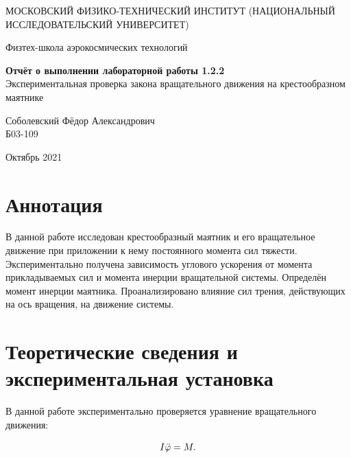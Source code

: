 \documentclass[a4paper,12pt]{article} %
\date{\today}
\begin{document}
\begin{titlepage}
	\begin{center}
		{\large МОСКОВСКИЙ ФИЗИКО-ТЕХНИЧЕСКИЙ ИНСТИТУТ (НАЦИОНАЛЬНЫЙ ИССЛЕДОВАТЕЛЬСКИЙ УНИВЕРСИТЕТ)}
	\end{center}
	\begin{center}
		{\large Физтех-школа аэрокосмических технологий}
	\end{center}
	
	
	\vspace{4.5cm}
	{\huge
		\begin{center}
			{\bf Отчёт о выполнении лабораторной работы 1.2.2}\\
			Экспериментальная проверка закона вращательного движения на крестообразном маятнике
		\end{center}
	}
	\vspace{1cm}
	\begin{center}
		{\large Соболевский Фёдор Александрович \\
			\vspace{0.2cm}
			Б03-109}
	\end{center}
	\vspace{8cm}
	\begin{center}
		Октябрь 2021
	\end{center}
\end{titlepage}

\section{Аннотация}

В данной работе исследован крестообразный маятник и его вращательное движение при приложении к нему постоянного момента сил тяжести. Экспериментально получена зависимость углового ускорения от момента прикладываемых сил и момента инерции вращательной системы. Определён момент инерции маятника. Проанализировано влияние сил трения, действующих на ось вращения, на движение системы.

\section{Теоретические сведения и экспериментальная установка}

В данной работе экспериментально проверяется уравнение вращательного движения:

\begin{equation}
    I\Ddot{\varphi} = M.
    \label{rotationEquation}
\end{equation}
\end{document}
